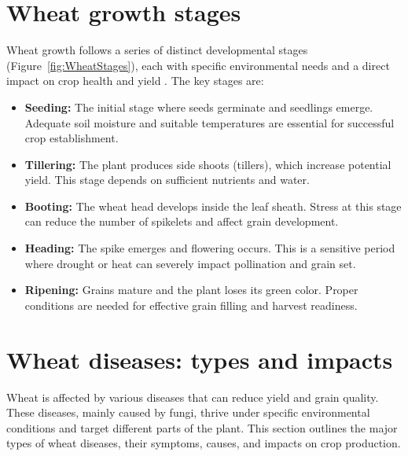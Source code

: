 \section{Wheat growth stages}
Wheat growth follows a series of distinct developmental stages (Figure~\ref{fig:WheatStages}), each with specific environmental needs and a direct impact on crop health and yield \parencite{shafi2020multi}. The key stages are:

\begin{itemize}
    \item \textbf{Seeding:} The initial stage where seeds germinate and seedlings emerge. Adequate soil moisture and suitable temperatures are essential for successful crop establishment.
    
    \item \textbf{Tillering:} The plant produces side shoots (tillers), which increase potential yield. This stage depends on sufficient nutrients and water.
    
    \item \textbf{Booting:} The wheat head develops inside the leaf sheath. Stress at this stage can reduce the number of spikelets and affect grain development.
    
    \item \textbf{Heading:} The spike emerges and flowering occurs. This is a sensitive period where drought or heat can severely impact pollination and grain set.
    
    \item \textbf{Ripening:} Grains mature and the plant loses its green color. Proper conditions are needed for effective grain filling and harvest readiness.
\end{itemize}



\section{Wheat diseases: types and impacts}
Wheat is affected by various diseases that can reduce yield and grain quality. These diseases, mainly caused by fungi, thrive under specific environmental conditions and target different parts of the plant. This section outlines the major types of wheat diseases, their symptoms, causes, and impacts on crop production.


